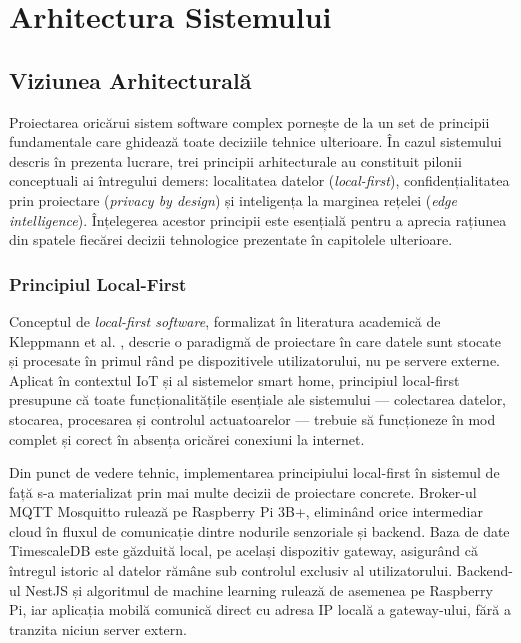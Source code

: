 \documentclass[12pt, twoside, a4paper]{report}
\begin{document}
\chapter{Arhitectura Sistemului}

\section{Viziunea Arhitecturală}

Proiectarea oricărui sistem software complex pornește de la un set de principii
fundamentale care ghidează toate deciziile tehnice ulterioare. În cazul sistemului
descris în prezenta lucrare, trei principii arhitecturale au constituit pilonii
conceptuali ai întregului demers: localitatea datelor (\textit{local-first}),
confidențialitatea prin proiectare (\textit{privacy by design}) și inteligența la
marginea rețelei (\textit{edge intelligence}). Înțelegerea acestor principii este
esențială pentru a aprecia rațiunea din spatele fiecărei decizii tehnologice prezentate
în capitolele ulterioare.

\subsection{Principiul Local-First}

Conceptul de \textit{local-first software}, formalizat în literatura academică de
Kleppmann et al. \cite{kleppmann2019}, descrie o paradigmă de proiectare
în care datele sunt stocate și procesate în primul rând pe dispozitivele utilizatorului,
nu pe servere externe. Aplicat în contextul IoT și al sistemelor smart home, principiul
local-first presupune că toate funcționalitățile esențiale ale sistemului ---
colectarea datelor, stocarea, procesarea și controlul actuatoarelor --- trebuie să
funcționeze în mod complet și corect în absența oricărei conexiuni la internet.

Din punct de vedere tehnic, implementarea principiului local-first în sistemul de
față s-a materializat prin mai multe decizii de proiectare concrete. Broker-ul MQTT
Mosquitto rulează pe Raspberry Pi 3B+, eliminând orice intermediar cloud în fluxul de
comunicație dintre nodurile senzoriale și backend. Baza de date TimescaleDB este
găzduită local, pe același dispozitiv gateway, asigurând că întregul istoric al datelor
rămâne sub controlul exclusiv al utilizatorului. Backend-ul NestJS și algoritmul de
machine learning rulează de asemenea pe Raspberry Pi, iar aplicația mobilă comunică
direct cu adresa IP locală a gateway-ului, fără a tranzita niciun server extern.
\end{document}
